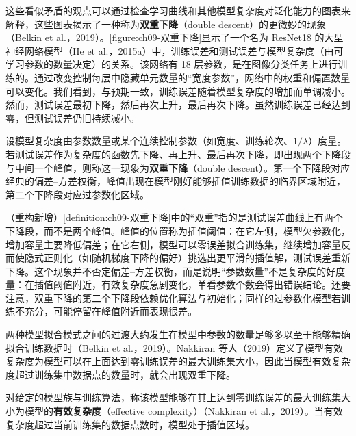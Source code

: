 \documentclass[../../main.tex]{subfiles}
\begin{document}
这些看似矛盾的观点可以通过检查学习曲线和其他模型复杂度对泛化能力的图表来解释，这些图表揭示了一种称为\textbf{双重下降}（double descent）的更微妙的现象（Belkin et al.，2019）。\cref{figure:ch09-双重下降}显示了一个名为 ResNet18 的大型神经网络模型（He et al.，2015a）中，训练误差和测试误差与模型复杂度（由可学习参数的数量决定）的关系。该网络有 18 层参数，是在图像分类任务上进行训练的。通过改变控制每层中隐藏单元数量的“宽度参数”，网络中的权重和偏置数量可以变化。我们看到，与预期一致，训练误差随着模型复杂度的增加而单调减小。然而，测试误差最初下降，然后再次上升，最后再次下降。虽然训练误差已经达到零，但测试误差仍旧持续减小。

\begin{definition}[双重下降]\label{definition:ch09-双重下降}
设模型复杂度由参数数量或某个连续控制参数（如宽度、训练轮次、$1/\lambda$）度量。若测试误差作为复杂度的函数先下降、再上升、最后再次下降，即出现两个下降段与中间一个峰值，则称这一现象为\textbf{双重下降}（double descent）。第一个下降段对应经典的偏差--方差权衡，峰值出现在模型刚好能够插值训练数据的临界区域附近，第二个下降段对应过参数化区域。
\end{definition}

\begin{remark}（重构新增）\cref{definition:ch09-双重下降}中的“双重”指的是测试误差曲线上有两个下降段，而不是两个峰值。峰值的位置称为插值阈值：在它左侧，模型欠参数化，增加容量主要降低偏差；在它右侧，模型可以零误差拟合训练集，继续增加容量反而使隐式正则化（如随机梯度下降的偏好）挑选出更平滑的插值解，测试误差重新下降。这个现象并不否定偏差--方差权衡，而是说明“参数数量”不是复杂度的好度量：在插值阈值附近，有效复杂度急剧变化，单看参数个数会得出错误结论。还要注意，双重下降的第二个下降段依赖优化算法与初始化；同样的过参数化模型若训练不充分，可能停留在峰值附近而表现很差。
\end{remark}

两种模型拟合模式之间的过渡大约发生在模型中参数的数量足够多以至于能够精确拟合训练数据时（Belkin et al.，2019）。Nakkiran 等人（2019）定义了模型有效复杂度为模型可以在上面达到零训练误差的最大训练集大小，因此当模型有效复杂度超过训练集中数据点的数量时，就会出现双重下降。

\begin{definition}[模型有效复杂度]\label{definition:ch09-模型有效复杂度}
对给定的模型族与训练算法，称该模型能够在其上达到零训练误差的最大训练集大小为模型的\textbf{有效复杂度}（effective complexity）（Nakkiran et al.，2019）。当有效复杂度超过当前训练集的数据点数时，模型处于插值区域。
\end{definition}
\end{document}
